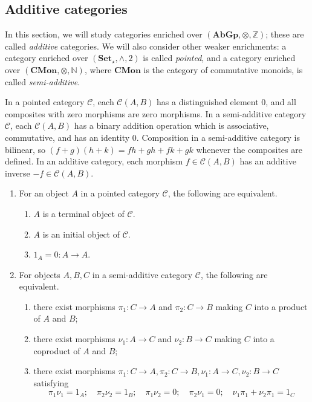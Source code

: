 \subsection{Additive categories}
In this section, we will study categories enriched over \( (\mathbf{AbGp}, \otimes, \mathbb Z) \); these are called \emph{additive} categories.
We will also consider other weaker enrichments: a category enriched over \( (\mathbf{Set}_\star, \wedge, 2) \) is called \emph{pointed}, and a category enriched over \( (\mathbf{CMon}, \otimes, \mathbb N) \), where \( \mathbf{CMon} \) is the category of commutative monoids, is called \emph{semi-additive}.

In a pointed category \( \mathcal C \), each \( \mathcal C(A, B) \) has a distinguished element 0, and all composites with zero morphisms are zero morphisms.
In a semi-additive category \( \mathcal C \), each \( \mathcal C(A, B) \) has a binary addition operation which is associative, commutative, and has an identity \( 0 \).
Composition in a semi-additive category is bilinear, so \( (f + g)(h + k) = fh + gh + fk + gk \) whenever the composites are defined.
In an additive category, each morphism \( f \in \mathcal C(A, B) \) has an additive inverse \( -f \in \mathcal C(A, B) \).
\begin{lemma}
    \begin{enumerate}
        \item For an object \( A \) in a pointed category \( \mathcal C \), the following are equivalent.
        \begin{enumerate}
            \item \( A \) is a terminal object of \( \mathcal C \).
            \item \( A \) is an initial object of \( \mathcal C \).
            \item \( 1_A = 0 : A \to A \).
        \end{enumerate}
        \item For objects \( A, B, C \) in a semi-additive category \( \mathcal C \), the following are equivalent.
        \begin{enumerate}
            \item there exist morphisms \( \pi_1 : C \to A \) and \( \pi_2 : C \to B \) making \( C \) into a product of \( A \) and \( B \);
            \item there exist morphisms \( \nu_1 : A \to C \) and \( \nu_2 : B \to C \) making \( C \) into a coproduct of \( A \) and \( B \);
            \item there exist morphisms \( \pi_1 : C \to A, \pi_2 : C \to B, \nu_1 : A \to C, \nu_2 : B \to C \) satisfying
            \[ \pi_1 \nu_1 = 1_A;\quad \pi_2 \nu_2 = 1_B;\quad \pi_1 \nu_2 = 0;\quad \pi_2 \nu_1 = 0;\quad \nu_1 \pi_1 + \nu_2 \pi_1 = 1_C \]
        \end{enumerate}
    \end{enumerate}
\end{lemma}
